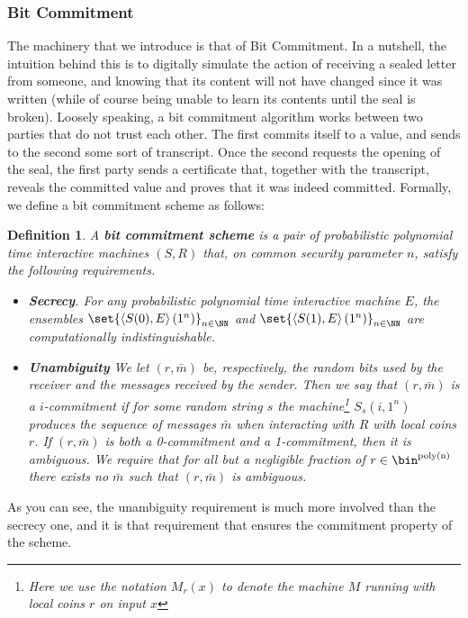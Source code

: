\documentclass{article}
\newtheorem{definition}{Definition}
\begin{document}
\subsubsection{Bit Commitment}
The machinery that we introduce is that of Bit Commitment. In a nutshell, the intuition behind this
is to digitally simulate the action of receiving a sealed letter from someone, and knowing that its content will not have changed since it was written (while of course being unable to learn its contents until the seal is broken).
Loosely speaking, a bit commitment algorithm works between two parties that do not trust each other.
The first commits itself to a value, and sends to the second some sort of transcript.
Once the second requests the opening of the seal, the first party sends a certificate that, together with the transcript, reveals the committed value and proves that it was indeed committed.
Formally, we define a bit commitment scheme as follows:
\begin{definition}
    A \textbf{bit commitment scheme} is a pair of probabilistic polynomial time interactive machines $(S, R)$ that,
    on common security parameter $n$, satisfy the following requirements.
    \begin{itemize}
        \item \textbf{Secrecy}. For any probabilistic polynomial time interactive machine $E$,
              the ensembles $\set{ \left<S(0), E\right>(1^n) }_{n \in \NN}$ and $\set{ \left<S(1), E\right>(1^n) }_{n \in \NN}$ are computationally indistinguishable.
        \item \textbf{Unambiguity} We let $(r, \bar{m})$ be, respectively, the random bits used by the receiver and the messages received by the sender.
              Then we say that $(r, \bar{m})$ is a $i$-commitment if for some random string $s$ the machine\footnote{Here we use the notation $M_r(x)$ to denote the machine $M$ running with local coins $r$ on input $x$} $S_s(i, 1^n)$ produces the sequence of messages $\bar{m}$ when interacting with $R$ with local coins $r$.
              If $(r, \bar{m})$ is both a 0-commitment and a 1-commitment, then it is ambiguous.
              We require that for all but a negligible fraction of $r \in \bin^{\text{poly(n)}}$ there exists no $\bar{m}$ such that $(r, \bar{m})$ is ambiguous.
    \end{itemize}
\end{definition}
As you can see, the unambiguity requirement is much more involved than the secrecy one, and it is that requirement that ensures the commitment property of the scheme.
\end{document}
